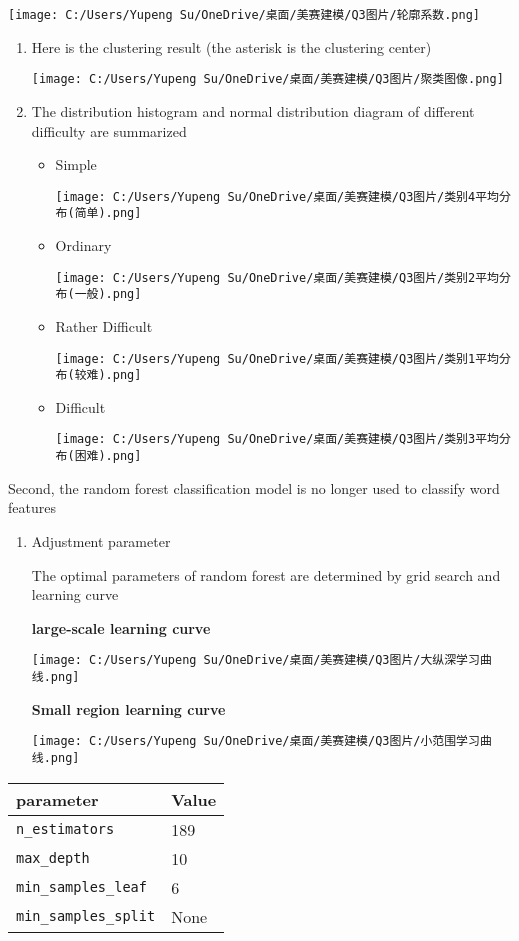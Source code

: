 \documentclass[
]{article}
\begin{document}
\texttt{[image: C:/Users/Yupeng Su/OneDrive/桌面/美赛建模/Q3图片/轮廓系数.png]}

\begin{enumerate}
\def\labelenumi{\arabic{enumi}.}
\item
  Here is the clustering result (the asterisk is the clustering center)

  \texttt{[image: C:/Users/Yupeng Su/OneDrive/桌面/美赛建模/Q3图片/聚类图像.png]}
\item
  The distribution histogram and normal distribution diagram of
  different difficulty are summarized

  \begin{itemize}
  \item
    Simple

    \texttt{[image: C:/Users/Yupeng Su/OneDrive/桌面/美赛建模/Q3图片/类别4平均分布(简单).png]}
  \item
    Ordinary

    \texttt{[image: C:/Users/Yupeng Su/OneDrive/桌面/美赛建模/Q3图片/类别2平均分布(一般).png]}
  \item
    Rather Difficult

    \texttt{[image: C:/Users/Yupeng Su/OneDrive/桌面/美赛建模/Q3图片/类别1平均分布(较难).png]}
  \item
    Difficult

    \texttt{[image: C:/Users/Yupeng Su/OneDrive/桌面/美赛建模/Q3图片/类别3平均分布(困难).png]}
  \end{itemize}
\end{enumerate}

Second, the random forest classification model is no longer used to
classify word features

\begin{enumerate}
\def\labelenumi{\arabic{enumi}.}
\item
  Adjustment parameter

  The optimal parameters of random forest are determined by grid search
  and learning curve

  \textbf{large-scale learning curve}

  \texttt{[image: C:/Users/Yupeng Su/OneDrive/桌面/美赛建模/Q3图片/大纵深学习曲线.png]}

  \textbf{Small region learning curve}

  \texttt{[image: C:/Users/Yupeng Su/OneDrive/桌面/美赛建模/Q3图片/小范围学习曲线.png]}
\end{enumerate}

\begin{longtable}[]{@{}ll@{}}
\toprule\noalign{}
parameter & Value \\
\midrule\noalign{}
\endhead
\bottomrule\noalign{}
\endlastfoot
\texttt{n\_estimators} & 189 \\
\texttt{max\_depth} & 10 \\
\texttt{min\_samples\_leaf} & 6 \\
\texttt{min\_samples\_split} & None \\
\end{longtable}
\end{document}
